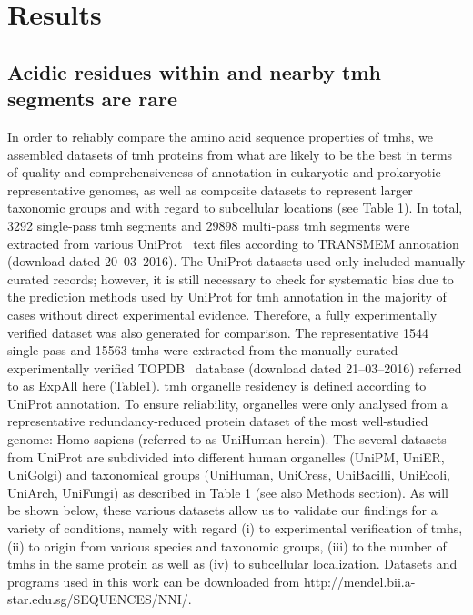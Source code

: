 \section{Results}

\subsection{Acidic residues within and nearby \gls{tmh} segments are rare}

In order to reliably compare the amino acid sequence properties of \gls{tmh}s, we assembled datasets of \gls{tmh} proteins from what are likely to be the best in terms of quality and comprehensiveness of annotation in eukaryotic and prokaryotic representative genomes, as well as composite datasets to represent larger taxonomic groups and with regard to subcellular locations (see Table 1). In total, 3292 single-pass \gls{tmh} segments and 29898 multi-pass \gls{tmh} segments were extracted from various UniProt~\cite{TheUniProtConsortium2014} text files according to TRANSMEM annotation (download dated 20--03--2016). The UniProt datasets used only included manually curated records; however, it is still necessary to check for systematic bias due to the prediction methods used by UniProt for \gls{tmh} annotation in the majority of cases without direct experimental evidence. Therefore, a fully experimentally verified dataset was also generated for comparison. The representative 1544 single-pass and 15563 \gls{tmh}s were extracted from the manually curated experimentally verified TOPDB~\cite{Dobson2015} database (download dated 21--03--2016) referred to as ExpAll here (Table1). \gls{tmh} organelle residency is defined according to UniProt annotation. To ensure reliability, organelles were only analysed from a representative redundancy-reduced protein dataset of the most well-studied genome: Homo sapiens (referred to as UniHuman herein). The several datasets from UniProt  are subdivided into different human organelles (UniPM, UniER, UniGolgi) and taxonomical groups (UniHuman, UniCress, UniBacilli, UniEcoli, UniArch, UniFungi) as described in Table 1 (see also Methods section). As will be shown below, these various datasets allow us to validate our findings for a variety of conditions, namely with regard (i) to experimental verification of \gls{tmh}s, (ii) to origin from various species and taxonomic groups, (iii) to the number of \gls{tmh}s in the same protein as well as (iv) to subcellular localization. Datasets and programs used in this work can be downloaded from http://mendel.bii.a-star.edu.sg/SEQUENCES/NNI/.

